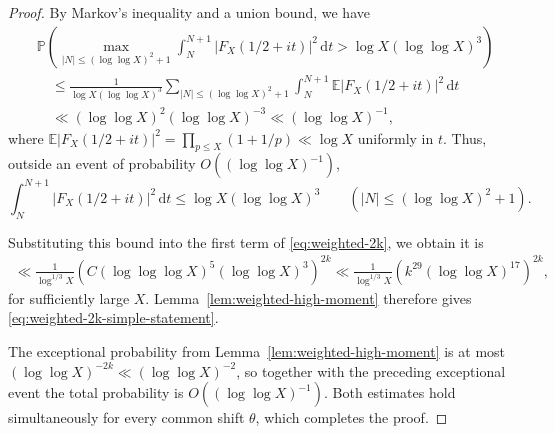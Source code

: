 \documentclass[a4paper,12pt,reqno]{amsart}
\numberwithin{equation}{section}
\theoremstyle{remark}
\newcommand{\E}{\mathbb{E}}
\newcommand{\p}{\mathbb{P}}
\begin{document}
\begin{proof}
 By Markov's inequality and a union bound,  we have
\[
 \begin{aligned}
 &\p\left(
 \max_{|N|\leq(\log\log X)^2+1}
 \int_N^{N+1}|F_X(1/2+it)|^2\,\mathrm{d}t
 >
 \log X(\log\log X)^3
 \right)\\
 &\quad\leq
 \frac1{\log X(\log\log X)^3}
 \sum_{|N|\leq(\log\log X)^2+1}
 \int_N^{N+1}
 \E|F_X(1/2+it)|^2\,\mathrm{d}t\\
 &\quad\ll
 (\log\log X)^2(\log\log X)^{-3}
 \ll(\log\log X)^{-1},
 \end{aligned}
\]
where \( \E|F_X(1/2+it)|^2
 =
 \prod_{p\leq X}\left(1+1/p\right)
 \ll\log X
\)
uniformly in $t$.
Thus, outside an event of probability $O((\log\log X)^{-1})$,
\[
 \int_N^{N+1}|F_X(1/2+it)|^2\,\mathrm{d}t
 \leq
 \log X(\log\log X)^3
 \qquad
 (|N|\leq(\log\log X)^2+1).
\]


Substituting this bound into the first term of
\eqref{eq:weighted-2k}, we obtain it is
\[
 \begin{aligned}
\ll
 \frac1{\log^{1/3}X}
 \left(
 C(\log\log\log X)^5(\log\log X)^3
 \right)^{2k}\ll
 \frac1{\log^{1/3}X}
 \left(
 k^{29}(\log\log X)^{17}
 \right)^{2k},
 \end{aligned}
\]
for sufficiently large $X$.  Lemma~\ref{lem:weighted-high-moment}
therefore gives \eqref{eq:weighted-2k-simple-statement}.

The exceptional probability from
Lemma~\ref{lem:weighted-high-moment} is at most
$(\log\log X)^{-2k}\ll(\log\log X)^{-2}$, so together with the
preceding exceptional event the total probability is
$O((\log\log X)^{-1})$.  Both estimates hold simultaneously for every
common shift $\theta$, which completes the proof.
\end{proof}
\end{document}
